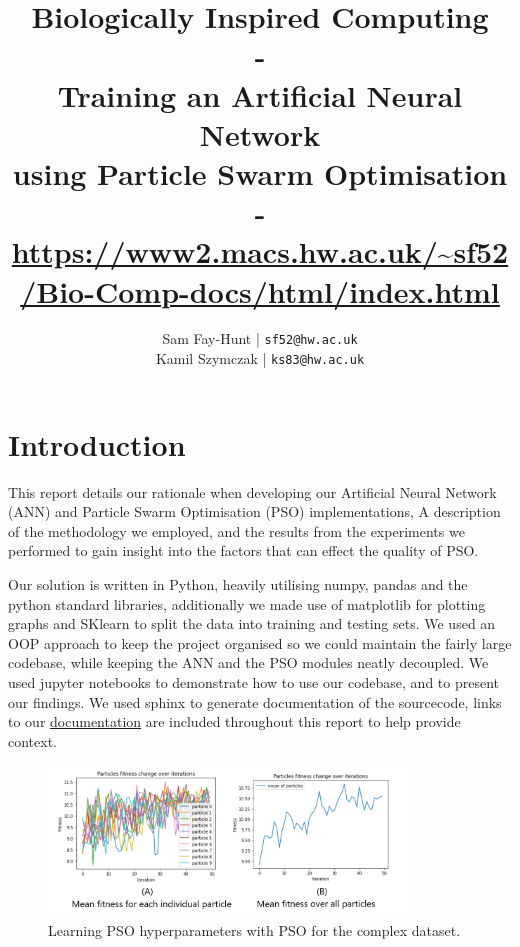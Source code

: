 \documentclass[12pt]{article}
\begin{document}
\title{%
	\bf Biologically Inspired Computing\\ 
    \large - \\
    Training an Artificial Neural Network\\
     using Particle Swarm Optimisation\\
     -\\
     \url{https://www2.macs.hw.ac.uk/~sf52/Bio-Comp-docs/html/index.html}}

\author{
	Sam Fay-Hunt | \texttt{sf52@hw.ac.uk}\\
	Kamil Szymczak | \texttt{ks83@hw.ac.uk}
}

\maketitle
\thispagestyle{empty}
\pagebreak

\tableofcontents
\thispagestyle{empty}
\pagebreak


\setcounter{page}{1}

\section{Introduction}
This report details our rationale when developing our Artificial Neural Network (ANN) and Particle Swarm Optimisation (PSO) implementations, A description of the methodology we employed, and the results from the experiments we performed to gain insight into the factors that can effect the quality of PSO.

Our solution is written in Python, heavily utilising numpy, pandas and the python standard libraries, additionally we made use of matplotlib for plotting graphs and SKlearn to split the data into training and testing sets.
We used an OOP approach to keep the project organised so we could maintain the fairly large codebase, while keeping the ANN and the PSO modules neatly decoupled.
We used jupyter notebooks to demonstrate how to use our codebase, and to present our findings.
We used sphinx to generate documentation of the sourcecode, links to our \href{https://www2.macs.hw.ac.uk/~sf52/Bio-Comp-docs/html/index.html}{documentation} are included throughout this report to help provide context.

\begin{figure}[H]
    \begin{center}
        \includegraphics[width=0.85\textwidth]{comples_pso_combined.png} 
    \end{center}
    
    \caption{Learning PSO hyperparameters with PSO for the complex dataset.}
    \label{fig:complexpsolearning}   
\end{figure}
\end{document}
